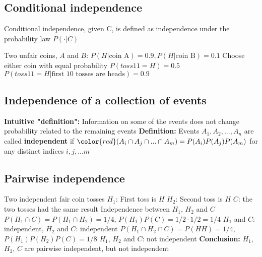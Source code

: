 \subsection{Conditional independence} 
\begin{outline}
\1 Conditional independence, given C, is defined as independence under the probability law $P(\cdot | C)$
\end{outline}

\begin{outline}
\1 Two unfair coins, $A$ and $B$: $P(H | \text{coin A}) = 0.9, P(H | \text{coin B}) = 0.1$
\1 Choose either coin with equal probability
  \2 $P(toss 11 = H) = 0.5$
  \2 $P(toss 11 = H | \text{first 10 tosses are heads}) = 0.9$
\end{outline}

\subsection{Independence of a collection of events} 
\begin{outline}
\1 \textbf{Intuitive "definition": } Information on some of the events does not change probability related to the remaining events
\1 \textbf{Definition: } Events $A_1, A_2, ..., A_n$ are called \textbf{independent} if $\color{red} (A_i \cap A_j \cap ... \cap A_m) = P(A_i)P(A_j)P(A_m)$ for any distinct indices $i,j,...m$
\end{outline}

\subsection{Pairwise independence} 
\begin{outline}
\1 Two independent fair coin tosses
  \2 $H_1$: First toss is $H$
  \2 $H_2$: Second toss is $H$
  \2 $C$: the two tosses had the same result
\1 Independence between $H_1$, $H_2$ and $C$
  \2 $P(H_1 \cap C) = P(H_1 \cap H_2) = 1/4$, $P(H_1) P(C) = 1/2 \cdot 1/2 = 1/4$
    \3 $H_1$ and $C$: independent, $H_2$ and $C$: independent
  \2 $P(H_1 \cap H_2 \cap C) = P(HH) = 1/4$, $P(H_1) P(H_2) P(C) = 1/8$
    \3 $H_1$, $H_2$ and $C$: not independent
\1 \textbf{Conclusion:} $H_1$, $H_2$, $C$ are pairwise independent, but not independent
\end{outline}

